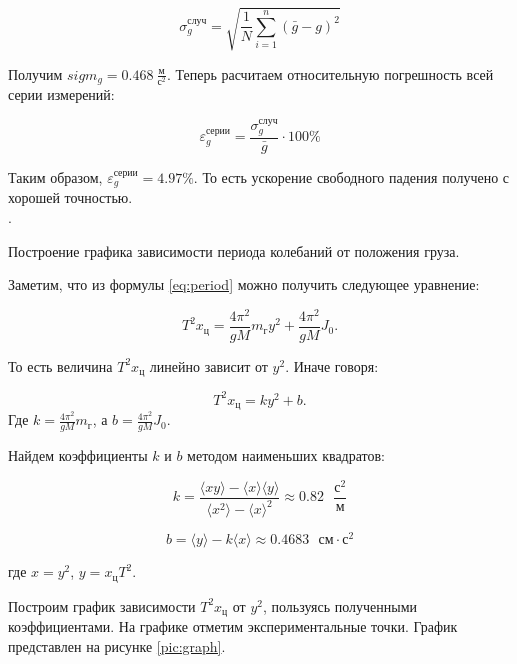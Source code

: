 \documentclass[a4paper, 12pt]{article}
\newcounter{Points}
\newcommand{\point}{\noindent \arabic{Points}. \addtocounter{Points}{1}}
\begin{document}
\begin{equation}
    \sigma_g^{случ} = \sqrt{\frac{1}{N}\sum_{i=1}^n(\bar{g} - g)^2} 
\end{equation}

Получим $sigm_g = 0.468 ~ \frac{м}{с^2}$. Теперь расчитаем относительную погрешность всей серии измерений:

\begin{equation}
    \varepsilon_g^{серии} =  \frac{\sigma_g^{случ}}{\bar{g}} \cdot 100\%
\end{equation}

Таким образом, $\varepsilon_g^{серии} = 4.97\%$. То есть ускорение свободного падения получено с хорошей точностью.\\

\point Построение графика зависимости периода колебаний от положения груза.

Заметим, что из формулы \ref{eq:period} можно получить следующее уравнение:

\begin{equation}
    T^2x_ц = \frac{4\pi^2}{gM}m_гy^2+\frac{4\pi^2}{gM}J_0.
\end{equation}

\noindent То есть величина $T^2x_ц$ линейно зависит от $y^2$. Иначе говоря:

\begin{equation}
    T^2x_ц = ky^2 + b.
    \label{eq:coef}
\end{equation}
\noindent Где $k = \frac{4\pi^2}{gM}m_г$, а $b = \frac{4\pi^2}{gM}J_0$.

Найдем коэффициенты $k$ и $b$ методом наименьших квадратов:

\begin{equation}
    k=\frac{\langle xy\rangle-\langle x\rangle \langle y\rangle}{\langle x^2\rangle - \langle x\rangle^2} \approx 0.82 \text{ }\frac{\text{с}^2}{\text{м}}
\end{equation}

\begin{equation}
    b=\langle y \rangle -k\langle x \rangle\approx 0.4683 \text{ }\text{см}\cdot\text{с}^2
\end{equation}

где $ x=y^2 $, $ y=x_цT^2 $.

Построим график зависимости $ T^2x_ц$ от $y^2$, пользуясь полученными коэффициентами. На графике отметим экспериментальные точки. График представлен на рисунке \ref{pic:graph}.
\end{document}
